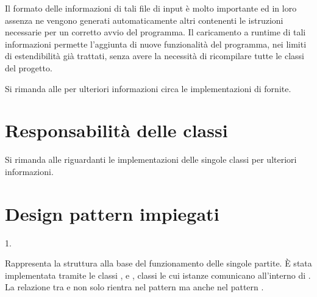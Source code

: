 \documentclass[letterpaper,10pt,italian,openany,oneside]{sphinxmanual}
\begin{document}
\noindent{}

\noindent{}

Il formato delle informazioni di tali file di input è molto importante ed in loro assenza ne vengono generati automaticamente altri
 contenenti le istruzioni necessarie per un corretto avvio del programma.
Il caricamento a runtime di tali informazioni permette l’aggiunta di nuove funzionalità del programma, nei limiti di estendibilità già trattati, senza avere la
necessità di ricompilare tutte le classi del progetto.

Si rimanda alle {\hyperref[\detokenize{source/packages::doc}]{}} per ulteriori informazioni circa le implementazioni di  fornite.


\section{Responsabilità delle classi}
\label{\detokenize{introduzione:responsabilita-delle-classi}}
Si rimanda alle {\hyperref[\detokenize{source/packages::doc}]{}} riguardanti le implementazioni delle singole classi per ulteriori informazioni.


\section{Design pattern impiegati}
\label{\detokenize{introduzione:design-pattern-impiegati}}
1.  %
\begin{footnote}[2]\sphinxAtStartFootnote
{}
%
\end{footnote}
Rappresenta la struttura alla base del funzionamento delle singole partite.
È stata implementata tramite le classi ,  e , classi le cui istanze comunicano all’interno di .
La relazione tra  e  non solo rientra nel pattern  ma anche nel pattern .
\end{document}
